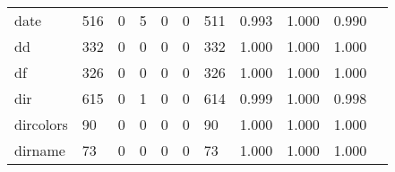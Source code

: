 \begin{longtable}{lp{1.2cm}p{1.2cm}p{1.2cm}p{1.2cm}p{1.2cm}p{1.2cm}p{1.2cm}p{1.2cm}p{1.2cm}p{1.2cm}}
date      &                                   516 &                                                  0 &                                                  5 &                                                  0 &                                                  0 &                                                511 &                                              0.993 &                                              1.000 &                                              0.990 \\
dd        &                                   332 &                                                  0 &                                                  0 &                                                  0 &                                                  0 &                                                332 &                                              1.000 &                                              1.000 &                                              1.000 \\
df        &                                   326 &                                                  0 &                                                  0 &                                                  0 &                                                  0 &                                                326 &                                              1.000 &                                              1.000 &                                              1.000 \\
dir       &                                   615 &                                                  0 &                                                  1 &                                                  0 &                                                  0 &                                                614 &                                              0.999 &                                              1.000 &                                              0.998 \\
dircolors &                                    90 &                                                  0 &                                                  0 &                                                  0 &                                                  0 &                                                 90 &                                              1.000 &                                              1.000 &                                              1.000 \\
dirname   &                                    73 &                                                  0 &                                                  0 &                                                  0 &                                                  0 &                                                 73 &                                              1.000 &                                              1.000 &                                              1.000 \\

\end{longtable}

